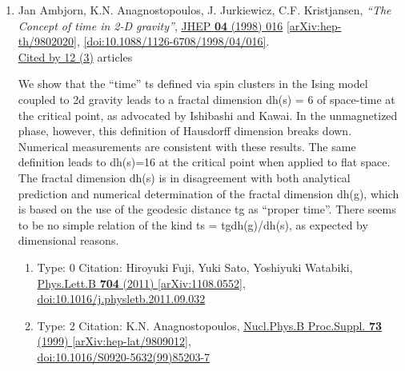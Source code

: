\documentclass[a4paper,10pt]{article}
\begin{document}
\begin{enumerate}
\begin{enumerate}
\end{enumerate}
\item Jan Ambjorn, K.N. Anagnostopoulos, J. Jurkiewicz, C.F. Kristjansen, {\it ``The Concept of time in 2-D gravity''}, \href{https://www.doi.org/10.1088/1126-6708/1998/04/016}{JHEP {\bf 04} (1998) 016} \href{https://arxiv.org/abs/hep-th/9802020}{[arXiv:hep-th/9802020]}, \href{https://www.doi.org/10.1088/1126-6708/1998/04/016}{[doi:10.1088/1126-6708/1998/04/016]}.
\\\href{https://inspirehep.net/literature/?q=refersto%3Arecid%3A466869}{Cited by 12 (3)} articles

We show that the ``time'' ts defined via spin clusters in the Ising model coupled to 2d gravity leads to a fractal dimension dh(s) = 6 of space-time at the critical point, as advocated by Ishibashi and Kawai. In the unmagnetized phase, however, this definition of Hausdorff dimension breaks down. Numerical measurements are consistent with these results. The same definition leads to dh(s)=16 at the critical point when applied to flat space. The fractal dimension dh(s) is in disagreement with both analytical prediction and numerical determination of the fractal dimension dh(g), which is based on the use of the geodesic distance tg as ``proper time''. There seems to be no simple relation of the kind ts = tg{dh(g)/dh(s)}, as expected by dimensional reasons.
\begin{enumerate}
  \item Type: 0 Citation: Hiroyuki Fuji, Yuki Sato, Yoshiyuki Watabiki, \href{https://www.doi.org/10.1016/j.physletb.2011.09.032}{Phys.Lett.B {\bf 704} (2011) }  \href{https://arxiv.org/abs/1108.0552}{[arXiv:1108.0552]},\\\href{https://www.doi.org/10.1016/j.physletb.2011.09.032}{doi:10.1016/j.physletb.2011.09.032}
  \item Type: 2 Citation: K.N. Anagnostopoulos, \href{https://www.doi.org/10.1016/S0920-5632(99)85203-7}{Nucl.Phys.B Proc.Suppl. {\bf 73} (1999) }  \href{https://arxiv.org/abs/hep-lat/9809012}{[arXiv:hep-lat/9809012]},\\\href{https://www.doi.org/10.1016/S0920-5632(99)85203-7}{doi:10.1016/S0920-5632(99)85203-7}

\end{enumerate}
\end{enumerate}
\end{document}
